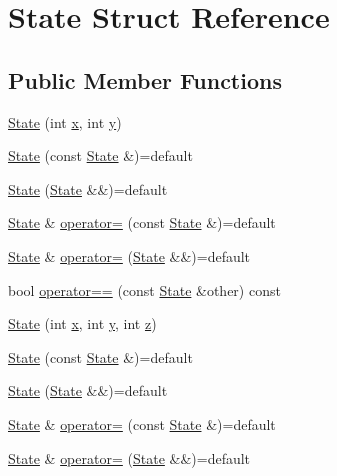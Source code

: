 \hypertarget{struct_state}{}\section{State Struct Reference}
\label{struct_state}
\subsection*{Public Member Functions}
\begin{DoxyCompactItemize}
\item 
\hyperlink{struct_state_a200e450f63a590ee3a777b60684963ee}{State} (int \hyperlink{struct_state_aafa13753373691d8ea3327717c61ef32}{x}, int \hyperlink{struct_state_a5dcf4a949618c21b85eb39ad41dfb08e}{y})
\item 
\hyperlink{struct_state_ad463f272453461a57c8b9e11f6cad8b6}{State} (const \hyperlink{struct_state}{State} \&)=default
\item 
\hyperlink{struct_state_a28668e1b15e6d6cfb63106769db218bc}{State} (\hyperlink{struct_state}{State} \&\&)=default
\item 
\hyperlink{struct_state}{State} \& \hyperlink{struct_state_a0c83d166ff2b6603a8e11c58d867e76f}{operator=} (const \hyperlink{struct_state}{State} \&)=default
\item 
\hyperlink{struct_state}{State} \& \hyperlink{struct_state_aa8d6ba634492b0c922f7dac1b87873c3}{operator=} (\hyperlink{struct_state}{State} \&\&)=default
\item 
bool \hyperlink{struct_state_ab98d310aaceb21737346521c5bc6fc6c}{operator==} (const \hyperlink{struct_state}{State} \&other) const
\item 
\hyperlink{struct_state_a044f9afae99d62ad92d1c10932e9be92}{State} (int \hyperlink{struct_state_aafa13753373691d8ea3327717c61ef32}{x}, int \hyperlink{struct_state_a5dcf4a949618c21b85eb39ad41dfb08e}{y}, int \hyperlink{struct_state_afbfffdf9a289cde788f99498adf1a0e5}{z})
\item 
\hyperlink{struct_state_ad463f272453461a57c8b9e11f6cad8b6}{State} (const \hyperlink{struct_state}{State} \&)=default
\item 
\hyperlink{struct_state_a28668e1b15e6d6cfb63106769db218bc}{State} (\hyperlink{struct_state}{State} \&\&)=default
\item 
\hyperlink{struct_state}{State} \& \hyperlink{struct_state_a0c83d166ff2b6603a8e11c58d867e76f}{operator=} (const \hyperlink{struct_state}{State} \&)=default
\item 
\hyperlink{struct_state}{State} \& \hyperlink{struct_state_aa8d6ba634492b0c922f7dac1b87873c3}{operator=} (\hyperlink{struct_state}{State} \&\&)=default

\end{DoxyCompactItemize}
